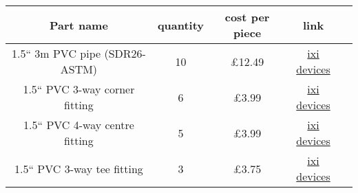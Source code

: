 \documentclass[11pt,twoside,a4paper]{article}
\theoremstyle{definition}
\begin{document}
{

\centering{\today}

}

\vspace{10mm} 

\begin{tabular}{|c|c|c|c|c|}
  \hline
  Part name & quantity & cost per piece & link \\
  \hline
  1.5`` 3m PVC pipe (SDR26-ASTM) & 10 & \pounds 12.49 & \href{http://www.ixi-devices.com/shop/1-12-inch-white-pvc-sdr-26-astm-pipe/}{ixi devices}\\
  1.5`` PVC 3-way corner fitting & 6 & \pounds 3.99 & \href{http://www.ixi-devices.com/shop/pvc-connector-corner-piece-1-12-inch/}{ixi devices}\\
  1.5`` PVC 4-way centre fitting & 5 & \pounds 3.99 & \href{http://www.ixi-devices.com/shop/pvc-connector-4-way-centre-1-12-inch/}{ixi devices}\\
  1.5`` PVC 3-way tee fitting & 3 & \pounds 3.75 & \href{http://www.ixi-devices.com/shop/pvc-connector-3-way-tee-1-12-inch/}{ixi devices}\\
  \hline
\end{tabular}

\vspace{5mm} 
\end{document}
